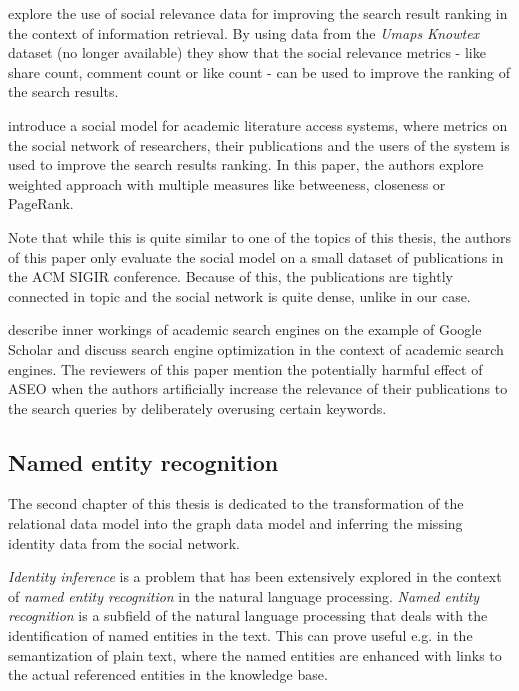 \cite{social-relevance-for-re-ranking-documents} explore the use of social relevance data for improving the search result ranking in the context of information retrieval.
By using data from the \textit{Umaps Knowtex} dataset (no longer available) they show that the social relevance metrics - like share count, comment count or like count - can be used to improve the ranking of the search results.

\cite{social-model-literature-access} introduce a social model for academic literature access systems, 
where metrics on the social network of researchers, their publications and the users of the system is used to improve 
the search results ranking. In this paper, the authors explore weighted approach with multiple measures like betweeness, closeness or PageRank.

Note that while this is quite similar to one of the topics of this thesis, the authors of this paper
only evaluate the social model on a small dataset of publications in the \ac{ACM} \ac{SIGIR} conference.
Because of this, the publications are tightly connected in topic and the social network is quite dense, unlike in our case.

\cite{aseo} describe inner workings of academic search engines on the example of Google Scholar and
discuss search engine optimization in the context of academic search engines. 
The reviewers of this paper mention the potentially harmful effect of \ac{ASEO} when the authors artificially increase 
the relevance of their publications to the search queries by deliberately overusing certain keywords.

\subsection*{Named entity recognition}

The second chapter of this thesis is dedicated to the transformation of the relational data model into the graph data model
and inferring the missing identity data from the social network.

\textit{Identity inference} is a problem that has been extensively explored in the context of \textit{named entity recognition} in the natural language processing.
\textit{Named entity recognition} is a subfield of the natural language processing that deals with the identification of named entities in the text.
This can prove useful e.g. in the semantization of plain text, where the named entities are enhanced with links to the actual referenced entities in the knowledge base.

